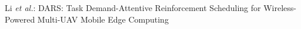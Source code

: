 \documentclass[journal]{IEEEtran}
\begin{document}
%
{Li \MakeLowercase{\textit{et al.}}: DARS: Task Demand-Attentive Reinforcement Scheduling for Wireless-Powered Multi-UAV Mobile Edge Computing}
% 











\maketitle
\end{document}
